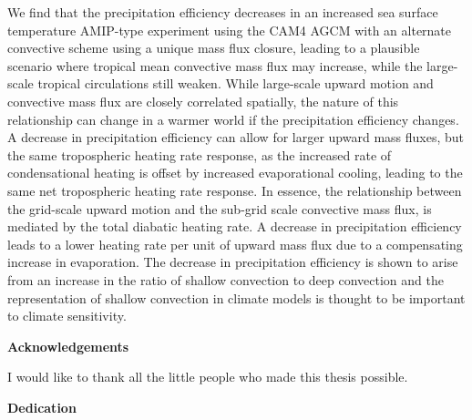 We find that the precipitation efficiency decreases in an increased sea surface temperature AMIP-type experiment using the CAM4 AGCM with an alternate convective scheme using a unique mass flux closure, leading to a plausible scenario where tropical mean convective mass flux may increase, while the large-scale tropical circulations still weaken. While large-scale upward motion and convective mass flux are closely correlated spatially, the nature of this relationship can change in a warmer world if the precipitation efficiency changes. A decrease in precipitation efficiency can allow for larger upward mass fluxes, but the same tropospheric heating rate response, as the increased rate of condensational heating is offset by increased evaporational cooling, leading to the same net tropospheric heating rate response. In essence, the relationship between the grid-scale upward motion and the sub-grid scale convective mass flux, is mediated by the total diabatic heating rate. A decrease in precipitation efficiency leads to a lower heating rate per unit of upward mass flux due to a compensating increase in evaporation. The decrease in precipitation efficiency is shown to arise from an increase in the ratio of shallow convection to deep convection and the representation of shallow convection in climate models is thought to be important to climate sensitivity.
\cleardoublepage


\begin{center}\textbf{Acknowledgements}\end{center}

I would like to thank all the little people who made this thesis possible.
\cleardoublepage


\begin{center}\textbf{Dedication}\end{center}

\cleardoublepage

\renewcommand\contentsname{Table of Contents}
\tableofcontents
\cleardoublepage
{}    %

\listoftables
\cleardoublepage
{}		%

\listoffigures
\cleardoublepage
{}		%

\cleardoublepage
{}		%


